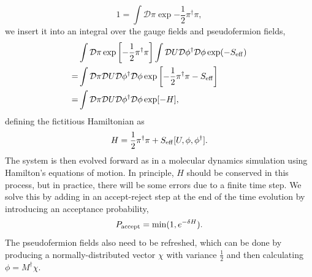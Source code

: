 \begin{equation}
    1 = \int \mathcal D \pi \exp{-\frac{1}{2}\pi^\dagger \pi},
\end{equation}
we insert it into an integral over the gauge fields and pseudofermion fields,
\begin{equation}
    \begin{aligned}
        &\int \mathcal{D} \pi \exp \left[-\frac{1}{2} \pi^{\dagger} \pi\right] \int \mathcal{D} U \mathcal{D} \phi^{\dagger} \mathcal{D} \phi \exp (-S_{\rm{eff}})\\
        =&\int \mathcal{D} \pi \mathcal{D} U \mathcal{D} \phi^{\dagger} \mathcal{D} \phi \exp \left[-\frac{1}{2} \pi^{\dagger} \pi-S_{\rm{eff}}\right]\\
        =&\int \mathcal{D} \pi \mathcal{D} U \mathcal{D} \phi^{\dagger} \mathcal{D} \phi \exp [-H],
    \end{aligned}
\end{equation}
defining the fictitious Hamiltonian as
\begin{equation}
    H = \frac{1}{2}\pi^\dagger \pi + S_{\rm{eff}}[U,\phi,\phi^\dagger].
\end{equation}
The system is then evolved forward as in a molecular dynamics simulation using Hamilton's equations of motion. In principle, $H$ should be conserved in this process, but in practice, there will be some errors due to a finite time step. We solve this by adding in an accept-reject step at the end of the time evolution by introducing an acceptance probability,
\begin{equation}
    P_{\rm{accept}} = \min(1,e^{-\delta H}).
\end{equation}
The pseudofermion fields also need to be refreshed, which can be done by producing a normally-distributed vector $\chi$ with variance $\frac{1}{2}$ and then calculating $\phi = M^\dagger \chi$.
